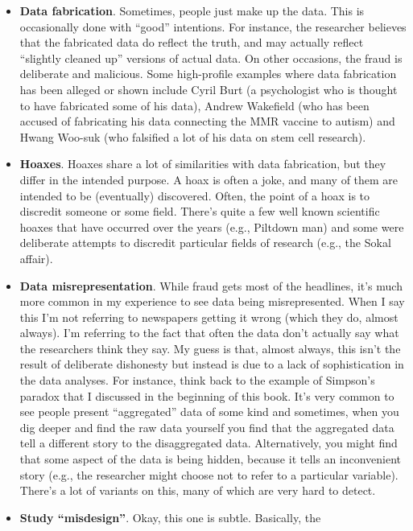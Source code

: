 \documentclass[
  letterpaper,
]{book}
\providecommand{\tightlist}{%
  \setlength{\itemsep}{0pt}\setlength{\parskip}{0pt}}\usepackage{longtable,booktabs,array}
\begin{document}
\begin{itemize}
\tightlist
\item
  \textbf{Data fabrication}. Sometimes, people just make up the data.
  This is occasionally done with ``good'' intentions. For instance, the
  researcher believes that the fabricated data do reflect the truth, and
  may actually reflect ``slightly cleaned up'' versions of actual data.
  On other occasions, the fraud is deliberate and malicious. Some
  high-profile examples where data fabrication has been alleged or shown
  include Cyril Burt (a psychologist who is thought to have fabricated
  some of his data), Andrew Wakefield (who has been accused of
  fabricating his data connecting the MMR vaccine to autism) and Hwang
  Woo-suk (who falsified a lot of his data on stem cell research).
\item
  \textbf{Hoaxes}. Hoaxes share a lot of similarities with data
  fabrication, but they differ in the intended purpose. A hoax is often
  a joke, and many of them are intended to be (eventually) discovered.
  Often, the point of a hoax is to discredit someone or some field.
  There's quite a few well known scientific hoaxes that have occurred
  over the years (e.g., Piltdown man) and some were deliberate attempts
  to discredit particular fields of research (e.g., the Sokal affair).
\item
  \textbf{Data misrepresentation}. While fraud gets most of the
  headlines, it's much more common in my experience to see data being
  misrepresented. When I say this I'm not referring to newspapers
  getting it wrong (which they do, almost always). I'm referring to the
  fact that often the data don't actually say what the researchers think
  they say. My guess is that, almost always, this isn't the result of
  deliberate dishonesty but instead is due to a lack of sophistication
  in the data analyses. For instance, think back to the example of
  Simpson's paradox that I discussed in the beginning of this book. It's
  very common to see people present ``aggregated'' data of some kind and
  sometimes, when you dig deeper and find the raw data yourself you find
  that the aggregated data tell a different story to the disaggregated
  data. Alternatively, you might find that some aspect of the data is
  being hidden, because it tells an inconvenient story (e.g., the
  researcher might choose not to refer to a particular variable).
  There's a lot of variants on this, many of which are very hard to
  detect.
\item
  \textbf{Study ``misdesign''}. Okay, this one is subtle. Basically, the

\end{itemize}
\end{document}
